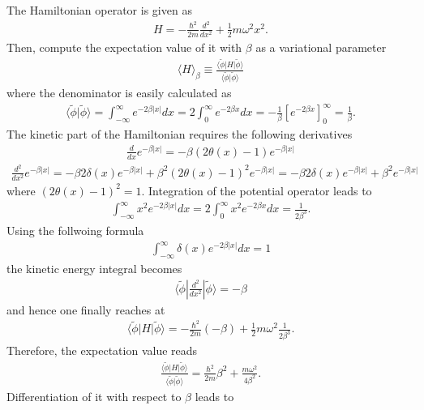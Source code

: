 \documentclass{jlreq}
\begin{document}
The Hamiltonian operator is given as
\begin{align}
    H=-\frac{\hbar^2}{2m}\frac{d^2}{dx^2}+\frac{1}{2}m\omega^2x^2.
\end{align}
Then, compute the expectation value of it with $\beta$ as a variational parameter
\begin{align}
    \langle H\rangle_\beta\equiv\frac{\langle\tilde{\phi}|H|\tilde{\phi}\rangle}{\langle\tilde{\phi}|\tilde{\phi}\rangle}
\end{align}
where the denominator is easily calculated as
\begin{align}
    \langle\tilde{\phi}|\tilde{\phi}\rangle=\int^\infty_{-\infty}e^{-2\beta|x|} dx=2\int^\infty_{0}e^{-2\beta x} dx = -\frac{1}{\beta}[e^{-2\beta x}]^\infty_0=\frac{1}{\beta}.
\end{align}
The kinetic part of the Hamiltonian requires the following derivatives
\begin{align}
    \frac{d}{dx}e^{-\beta |x|}=-\beta (2\theta(x)-1)e^{-\beta |x|}
\end{align}
\begin{align}
    \frac{d^2}{dx^2}e^{-\beta |x|}=-\beta 2\delta(x)e^{-\beta |x|}+\beta^2 (2\theta(x)-1)^2 e^{-\beta |x|}=-\beta 2\delta(x)e^{-\beta |x|}+\beta^2 e^{-\beta |x|}
\end{align}
where $(2\theta(x)-1)^2=1$. Integration of the potential operator leads to
\begin{align}
    \int^\infty_{-\infty} x^2 e^{-2\beta|x|}dx=2\int^{\infty}_0 x^2 e^{-2\beta x}dx=\frac{1}{2\beta^3}.
\end{align}
Using the follwoing formula
\begin{align}
    \int^\infty_{-\infty} \delta(x) e^{-2\beta|x|}dx=1
\end{align}
the kinetic energy integral becomes
\begin{align}
    \langle\tilde{\phi}|\frac{d^2}{dx^2}|\tilde{\phi}\rangle=-\beta
\end{align}
and hence one finally reaches at
\begin{align}
    \langle\tilde{\phi}|H|\tilde{\phi}\rangle=-\frac{\hbar^2}{2m}(-\beta)+\frac{1}{2}m\omega^2\frac{1}{2\beta^3}.
\end{align}
Therefore, the expectation value reads
\begin{align}
    \frac{\langle\tilde{\phi}|H|\tilde{\phi}\rangle}{\langle\tilde{\phi}|\tilde{\phi}\rangle}=\frac{\hbar^2}{2m}\beta^2+\frac{m\omega^2}{4\beta^2}.
\end{align}
Differentiation of it with respect to $\beta$ leads to
\end{document}
